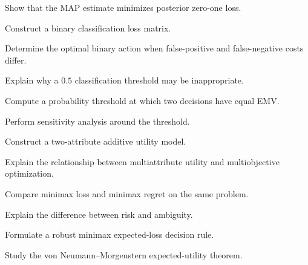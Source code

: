 \begin{exercise}[3]
Show that the MAP estimate minimizes posterior zero-one loss.
\end{exercise}

\begin{exercise}[3]
Construct a binary classification loss matrix.
\end{exercise}

\begin{exercise}[3]
Determine the optimal binary action when false-positive and false-negative
costs differ.
\end{exercise}

\begin{exercise}[3]
Explain why a \(0.5\) classification threshold may be inappropriate.
\end{exercise}

\begin{exercise}[3]
Compute a probability threshold at which two decisions have equal EMV.
\end{exercise}

\begin{exercise}[3]
Perform sensitivity analysis around the threshold.
\end{exercise}

\begin{exercise}[3]
Construct a two-attribute additive utility model.
\end{exercise}

\begin{exercise}[3]
Explain the relationship between multiattribute utility and
multiobjective optimization.
\end{exercise}

\begin{exercise}[3]
Compare minimax loss and minimax regret on the same problem.
\end{exercise}

\begin{exercise}[3]
Explain the difference between risk and ambiguity.
\end{exercise}

\begin{exercise}[3]
Formulate a robust minimax expected-loss decision rule.
\end{exercise}

\begin{exercise}[4]
Study the von Neumann--Morgenstern expected-utility theorem.
\end{exercise}

